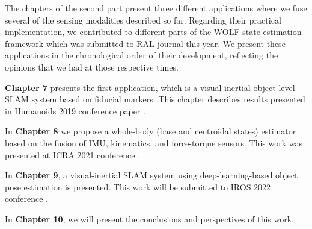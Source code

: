 \bigskip
The chapters of the second part present three different applications where we fuse several of the sensing modalities described so far.
Regarding their practical implementation, we contributed to different parts of the WOLF state estimation framework \cite{sola2021wolf} which was 
submitted to RAL journal this year. We present these applications in the chronological order of their development, reflecting the opinions that
we had at those respective times.

\bigskip
\textbf{Chapter 7} presents the first application, which is a visual-inertial object-level SLAM system based on fiducial markers. This chapter describes
results presented in Humanoids 2019 conference paper \cite{fourmy2019absolute}.

\bigskip
In \textbf{Chapter 8} we propose a whole-body (base and centroidal states) estimator based on the fusion of IMU, kinematics, and force-torque sensors. This
work was presented at ICRA 2021 conference \cite{fourmy2021contact}.

\bigskip
In \textbf{Chapter 9}, a visual-inertial SLAM system using deep-learning-based object pose estimation is presented. This work will be submitted to IROS 2022 conference \cite{debeunne2021cosyslam}.

\bigskip
In \textbf{Chapter 10}, we will present the conclusions and perspectives of this work.




